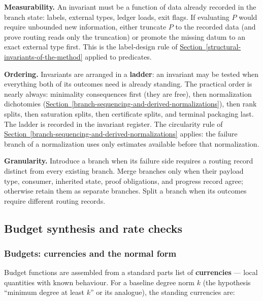 \documentclass[
  11pt,
]{article}
\theoremstyle{definition}
\newcommand{\secref}[1]{\hyperref[#1]{Section~\ref*{#1}}}
\begin{document}
\textbf{Measurability.} An invariant must be a function of data already
recorded in the branch state: labels, external types, ledger loads, exit
flags. If evaluating \(P\) would require unbounded new information,
either truncate \(P\) to the recorded data (and prove routing reads only
the truncation) or promote the missing datum to an exact external type
first. This is the label-design rule of \secref{structural-invariants-of-the-method} applied to
predicates.

\textbf{Ordering.} Invariants are arranged in a \textbf{ladder}: an
invariant may be tested when everything both of its outcomes need is
already standing. The practical order is nearly always: minimality
consequences first (they are free), then normalization dichotomies
(\secref{branch-sequencing-and-derived-normalizations}), then rank splits, then saturation splits, then
certificate splits, and terminal packaging last. The ladder is recorded
in the invariant register. The circularity rule of \secref{branch-sequencing-and-derived-normalizations} applies:
the failure branch of a normalization uses only estimates available
before that normalization.

\textbf{Granularity.} Introduce a branch when its failure side requires
a routing record distinct from every existing branch. Merge branches
only when their payload type, consumer, inherited state, proof
obligations, and progress record agree; otherwise retain them as
separate branches. Split a branch when its outcomes require different
routing records.

\subsection{Budget synthesis and rate checks}

\subsubsection{Budgets: currencies and the normal
form}\label{budgets-currencies-and-the-normal-form}

Budget functions are assembled from a standard parts list of
\textbf{currencies} --- local quantities with known behaviour. For a
baseline degree norm \(k\) (the hypothesis ``minimum degree at least
\(k\)'' or its analogue), the standing currencies are:
\end{document}
